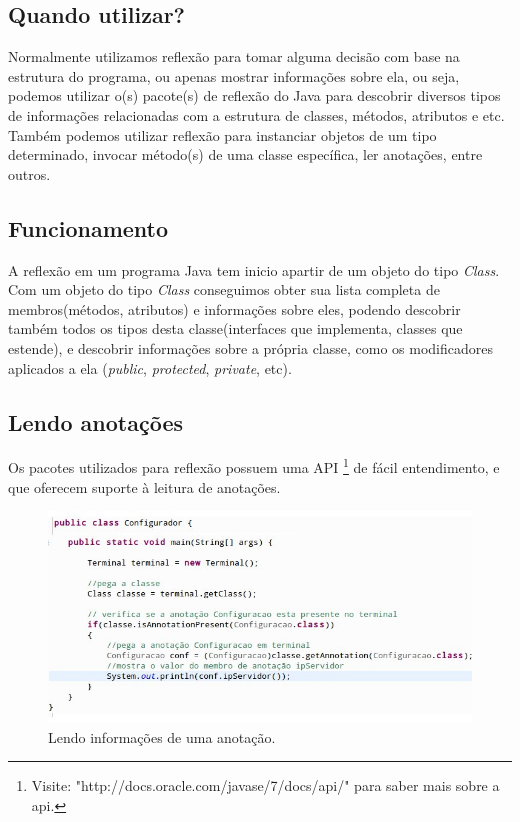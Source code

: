 \documentclass[tc,openright]{iiufrgs}
\begin{document}
\subsection{Quando utilizar?}

Normalmente utilizamos reflexão para tomar alguma decisão com base na estrutura do programa, ou apenas mostrar informações sobre ela, ou seja, podemos utilizar o(s) pacote(s) de reflexão do Java para descobrir diversos tipos de informações relacionadas com a estrutura de classes, métodos, atributos e etc. Também podemos utilizar reflexão para instanciar objetos de um tipo determinado, invocar método(s) de uma classe específica, ler anotações, entre outros.

\subsection{Funcionamento}

A reflexão em um programa Java tem inicio apartir de um objeto do tipo \textit{Class}. Com um objeto do tipo \textit{Class} conseguimos obter sua lista completa de membros(métodos, atributos) e informações sobre eles, podendo descobrir também todos os tipos desta classe(interfaces que implementa, classes que estende), e descobrir informações sobre a própria classe, como os modificadores aplicados a ela (\textit{public}, \textit{protected}, \textit{private}, etc). \cite{arnold2000java}

\subsection{Lendo anotações}

Os pacotes utilizados para reflexão possuem uma API \footnote{Visite: "http://docs.oracle.com/javase/7/docs/api/"  para saber mais sobre a api.} de fácil entendimento, e que oferecem suporte à leitura de anotações.

\begin{figure}[ht]
	\centering
	\includegraphics[scale=0.6]{figuras/lendoAnnotation.jpg}
	\caption{Lendo informações de uma anotação.}
	\label{fig:lendoAnotacao}
\end{figure}
\end{document}
